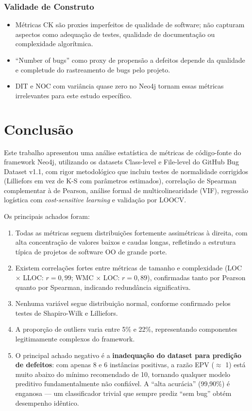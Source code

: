 \documentclass[12pt]{article}
\begin{document}
\subsubsection{Validade de Construto}
\begin{itemize}
  \item Métricas CK são proxies imperfeitos de qualidade de software; não capturam aspectos como adequação de testes, qualidade de documentação ou complexidade algorítmica.
  \item ``Number of bugs'' como proxy de propensão a defeitos depende da qualidade e completude do rastreamento de bugs pelo projeto.
  \item DIT e NOC com variância quase zero no Neo4j tornam essas métricas irrelevantes para este estudo específico.
\end{itemize}

\section{Conclusão} \label{sec:conclusao}

Este trabalho apresentou uma análise estatística de métricas de código-fonte do framework Neo4j, utilizando os datasets Class-level e File-level do GitHub Bug Dataset v1.1, com rigor metodológico que incluiu testes de normalidade corrigidos (Lilliefors em vez de K-S com parâmetros estimados), correlação de Spearman complementar à de Pearson, análise formal de multicolinearidade (VIF), regressão logística com \textit{cost-sensitive learning} e validação por LOOCV.

Os principais achados foram:

\begin{enumerate}
  \item Todas as métricas seguem distribuições fortemente assimétricas à direita, com alta concentração de valores baixos e caudas longas, refletindo a estrutura típica de projetos de software OO de grande porte.
  \item Existem correlações fortes entre métricas de tamanho e complexidade (LOC $\times$ LLOC: $r = 0{,}99$; WMC $\times$ LOC: $r = 0{,}89$), confirmadas tanto por Pearson quanto por Spearman, indicando redundância significativa.
  \item Nenhuma variável segue distribuição normal, conforme confirmado pelos testes de Shapiro-Wilk e Lilliefors.
  \item A proporção de outliers varia entre 5\% e 22\%, representando componentes legitimamente complexos do framework.
  \item O principal achado negativo é a \textbf{inadequação do dataset para predição de defeitos}: com apenas 8 e 6 instâncias positivas, a razão EPV ($\approx$ 1) está muito abaixo do mínimo recomendado de 10, tornando qualquer modelo preditivo fundamentalmente não confiável. A ``alta acurácia'' (99,90\%) é enganosa --- um classificador trivial que sempre prediz ``sem bug'' obtém desempenho idêntico.
\end{enumerate}
\end{document}
